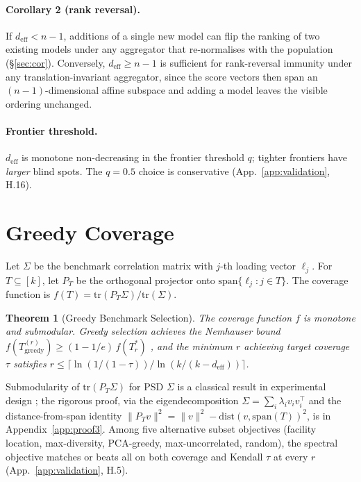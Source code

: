 \documentclass{article}
\newtheorem{theorem}{Theorem}
\begin{document}
\paragraph{Corollary 2 (rank reversal).} If $d_{\mathrm{eff}} < n - 1$,
additions of a single new model can flip the ranking of two existing
models under any aggregator that re-normalises with the population
(\S\ref{sec:cor}). Conversely, $d_{\mathrm{eff}} \ge n - 1$ is
sufficient for rank-reversal immunity under any translation-invariant
aggregator, since the score vectors then span an
$(n-1)$-dimensional affine subspace and adding a model leaves the
visible ordering unchanged.

\paragraph{Frontier threshold.} $d_{\mathrm{eff}}$ is monotone
non-decreasing in the frontier threshold $q$; tighter frontiers have
\emph{larger} blind spots. The $q = 0.5$ choice is conservative
(App.~\ref{app:validation}, H.16).


\section{Greedy Coverage}

Let $\Sigma$ be the benchmark correlation matrix with $j$-th loading
vector $\ell_j$. For $T \subseteq [k]$, let $P_T$ be the orthogonal
projector onto $\mathrm{span}\{\ell_j : j \in T\}$. The coverage
function is $f(T) = \mathrm{tr}(P_T \Sigma) / \mathrm{tr}(\Sigma)$.

\begin{theorem}[Greedy Benchmark Selection]
\label{thm:body:greedy}
The coverage function $f$ is monotone and submodular. Greedy selection
achieves the Nemhauser bound
$f(T_{\mathrm{greedy}}^{(r)}) \ge (1 - 1/e)\, f(T^*_r)$
\citep{nemhauser1978analysis}, and the minimum $r$ achieving target
coverage $\tau$ satisfies $r \le \lceil \ln(1/(1-\tau)) / \ln(k / (k -
d_{\mathrm{eff}})) \rceil$.
\end{theorem}

Submodularity of $\mathrm{tr}(P_T \Sigma)$ for PSD $\Sigma$ is a
classical result in experimental design \citep{daskempe2011submodular,
krause2008submodular}; the rigorous proof, via the
eigendecomposition $\Sigma = \sum_i \lambda_i v_i v_i^\top$ and the
distance-from-span identity $\|P_T v\|^2 = \|v\|^2 - \mathrm{dist}(v,
\mathrm{span}(T))^2$, is in Appendix~\ref{app:proof3}. Among five
alternative subset objectives (facility location, max-diversity,
PCA-greedy, max-uncorrelated, random), the spectral objective matches
or beats all on both coverage and Kendall $\tau$ at every $r$
(App.~\ref{app:validation}, H.5).
\end{document}
